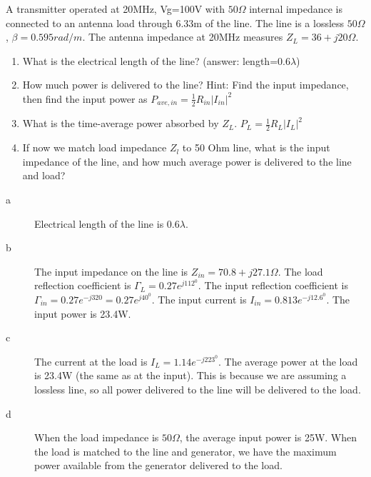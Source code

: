 \documentclass{ximera}
\begin{document}
\begin{example}
A transmitter operated at 20MHz, Vg=100V with $50 \Omega$ internal impedance is connected to an antenna load through 6.33m of the line. The line is a lossless $50 \Omega$, $\beta=0.595rad/m$. The antenna impedance at 20MHz measures $Z_L=36+j20 \Omega$. 
\begin{enumerate}
\item What is the electrical length of the line? (answer: length=0.6$\lambda$)
\item How much power is delivered to the line? Hint: Find the input impedance, then find the input power as $P_{ave,in}=\frac{1}{2}R_{in} |I_{in}|^2$
\item What is the time-average power absorbed by $Z_L$. $P_{L}=\frac{1}{2} R_L |I_{L}|^2$
\item If now we match load impedance $Z_l$ to 50 Ohm line, what is the input impedance of the line, and how much average power is delivered to the line and load?
\end{enumerate}
\begin{solution}
\begin{description}
\item[a] Electrical length of the line is $0.6 \lambda$.
\item[b]  The input impedance on the line is $Z_{in}=70.8+j27.1 \Omega$.
The load reflection coefficient is $\Gamma_L=0.27 e^{j112^0}$. The 
input reflection coefficient is $\Gamma_{in}= 0.27 e^{-j320} = 0.27 e^{j40^0}$.
The input current is $I_{in}=0.813 e^{-j12.6^0}$. 
The input power is 23.4W.
\item[c] The current at the load is $I_L=1.14 e^{-j223^0}$. The average power at the load is 23.4W (the same as at the input). This is because we are assuming a lossless line, so all power delivered to the line will be delivered to the load.
\item[d] When the load impedance is $50 \Omega$, the average input power is 25W. When the load is matched to the line and generator, we have the maximum power available from the generator delivered to the load.
\end{description}


 
\end{solution}


\end{example}
\end{document}
